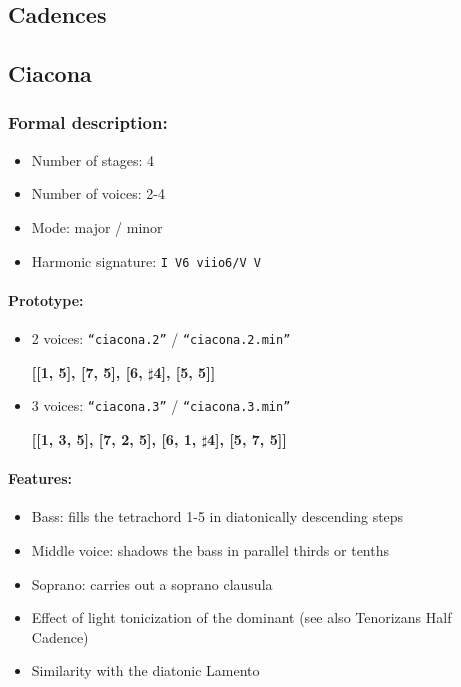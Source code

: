 \documentclass[11pt, openany]{article}
\begin{document}
	\subsection{Cadences}


	\subsection{Ciacona}

\subsubsection{Formal description:}
\begin{itemize}
\item Number of stages: 4
\item Number of voices: 2-4
\item Mode: major / minor
\item Harmonic signature: \texttt{I V6 viio6/V V}
\end{itemize}

\paragraph{Prototype:}
\begin{itemize}
\item 2 voices: \texttt{“ciacona.2”} / \texttt{“ciacona.2.min”}
	\begin{center}	
	\textbf{[[1, 5], [7, 5], [6, $\sharp$4], [5, 5]]}
	\end{center}
\item 3 voices: \texttt{“ciacona.3”} / \texttt{“ciacona.3.min”}
	\begin{center}	
	\textbf{[[1, 3, 5], [7, 2, 5], [6, 1, $\sharp$4], [5, 7, 5]]}
	\end{center}
\end{itemize}

\paragraph{Features:}
\begin{itemize}
\item Bass: fills the tetrachord 1-5 in diatonically descending steps
\item Middle voice: shadows the bass in parallel thirds or tenths
\item Soprano: carries out a soprano clausula
\item Effect of light tonicization of the dominant (see also Tenorizans Half Cadence)
\item Similarity with the diatonic Lamento
\end{itemize}
\end{document}
